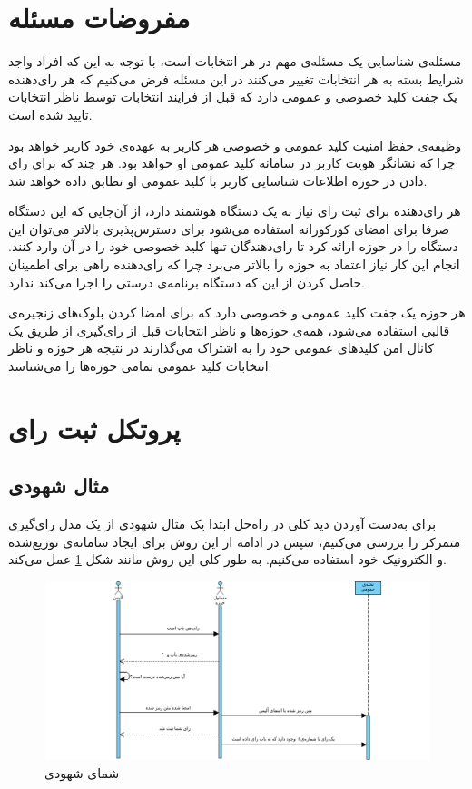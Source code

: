 \section{مفروضات مسئله}
مسئله‌ی شناسایی یک مسئله‌ی مهم در هر انتخابات است، با توجه به این که افراد واجد شرایط بسته به هر انتخابات تغییر می‌کنند در این مسئله فرض می‌کنیم که هر رای‌دهنده یک جفت کلید خصوصی و عمومی دارد که قبل از فرایند انتخابات توسط ناظر انتخابات تایید شده است. 
\par
وظیفه‌ی حفظ امنیت کلید عمومی و خصوصی هر کاربر به عهده‌ی خود کاربر خواهد بود چرا که نشانگر هویت کاربر در سامانه‌ کلید عمومی او خواهد بود. هر چند که برای رای دادن در حوزه اطلاعات شناسایی کاربر با کلید عمومی او تطابق داده خواهد شد.
\par
هر رای‌دهنده برای ثبت رای نیاز به یک دستگاه هوشمند دارد، از آن‌جایی که این دستگاه صرفا برای امضای کورکورانه استفاده می‌شود برای دسترس‌پذیری بالاتر می‌توان این دستگاه را در حوزه ارائه کرد تا رای‌دهندگان تنها کلید خصوصی خود را در آن وارد کنند.  انجام این کار نیاز اعتماد به حوزه را بالاتر می‌برد چرا که رای‌دهنده راهی برای اطمینان حاصل کردن از این که دستگاه برنامه‌ی درستی را اجرا می‌کند ندارد.
\par 
هر حوزه یک جفت کلید عمومی و خصوصی دارد که برای امضا کردن بلوک‌های زنجیره‌ی قالبی استفاده می‌شود، همه‌ی حوزه‌ها و ناظر انتخابات قبل از رای‌گیری از طریق یک کانال امن کلیدهای عمومی خود را به اشتراک می‌گذارند در نتیجه هر حوزه و ناظر انتخابات کلید عمومی تمامی حوزه‌ها را می‌شناسد.

\section{پروتکل ثبت رای‌}
\subsection{مثال شهودی}
برای به‌دست آوردن دید کلی در راه‌حل ابتدا یک مثال شهودی از یک مدل رای‌گیری متمرکز را بررسی می‌کنیم،‌ سپس در ادامه از این روش برای ایجاد سامانه‌ی توزیع‌شده و الکترونیک خود استفاده می‌کنیم. به طور کلی این روش مانند شکل \ref{fig:pen} عمل می‌کند.
\begin{figure}[h!]
	\centering
	\includegraphics[width=1\linewidth]{penandpaper.png}
	\caption {شمای شهودی}
	\label{fig:pen}
\end{figure}


